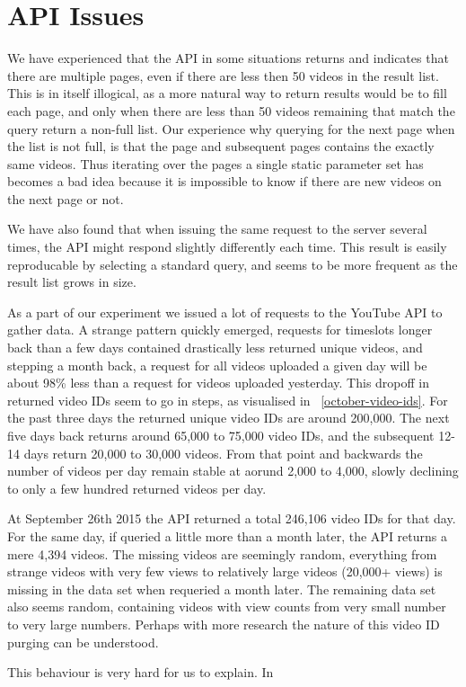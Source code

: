 \section{API Issues}
We have experienced that the API in some situations returns and indicates that
there are multiple pages, even if there are less then 50 videos in the result
list. This is in itself illogical, as a more natural way to return results would
be to fill each page, and only when there are less than 50 videos remaining that
match the query return a non-full list. Our experience why querying for the next
page when the list is not full, is that the page and subsequent pages contains 
the exactly same videos. Thus iterating over the pages a single static parameter
set has becomes a bad idea because it is impossible to know if there are new
videos on the next page or not.  %

We have also found that when issuing the same request to the server several
times, the API might respond slightly differently each time. This result is
easily reproducable by selecting a standard query, and seems to be more
frequent as the result list grows in size. %

As a part of our experiment we issued a lot of requests to the YouTube API to
gather data. A strange pattern quickly emerged, requests for timeslots longer
back than a few days contained drastically less returned unique videos, and 
stepping a month back, a request for all videos uploaded a given day will be 
about 98\% less than a request for videos uploaded yesterday. This dropoff in
returned video IDs seem to go in steps, as visualised in 
~\ref{october-video-ids}. For the past three days the returned unique video IDs
are around 200,000. The next five days back returns around 65,000 to 75,000
video IDs, and the subsequent 12-14 days return 20,000 to 30,000 videos. From
that point and backwards the number of videos per day remain stable at aorund
2,000 to 4,000, slowly declining to only a few hundred returned videos per day.

At September 26th 2015 the API returned a total 246,106 video IDs for that day.
For the same day, if queried a little more than a month later, the API returns
a mere 4,394 videos. The missing videos are seemingly random, everything from 
strange videos with very few views to relatively large videos (20,000+ views)
is missing in the data set when requeried a month later. The remaining data set
also seems random, containing videos with view counts from very small number to
very large numbers. Perhaps with more research the nature of this video ID
purging can be understood.

This behaviour is very hard for us to explain. In 


